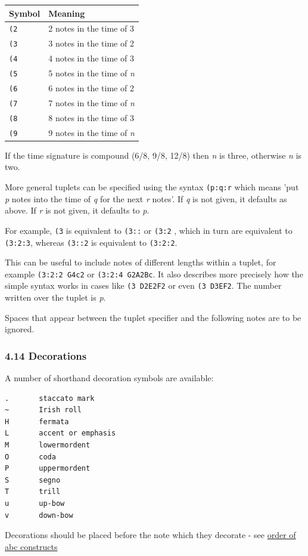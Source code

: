 \documentclass[oneside]{book}
\begin{document}
\begin{longtable}[]{@{}ll@{}}
\toprule
\textbf{Symbol} & \textbf{Meaning}\tabularnewline
\midrule
\endhead
\texttt{(2} & 2 notes in the time of 3\tabularnewline
\texttt{(3} & 3 notes in the time of 2\tabularnewline
\texttt{(4} & 4 notes in the time of 3\tabularnewline
\texttt{(5} & 5 notes in the time of \emph{n}\tabularnewline
\texttt{(6} & 6 notes in the time of 2\tabularnewline
\texttt{(7} & 7 notes in the time of \emph{n}\tabularnewline
\texttt{(8} & 8 notes in the time of 3\tabularnewline
\texttt{(9} & 9 notes in the time of \emph{n}\tabularnewline
\bottomrule
\end{longtable}

If the time signature is compound (6/8, 9/8, 12/8) then \emph{n} is
three, otherwise \emph{n} is two.

More general tuplets can be specified using the syntax \texttt{(p:q:r}
which means 'put \emph{p} notes into the time of \emph{q} for the next
\emph{r} notes'. If \emph{q} is not given, it defaults as above. If
\emph{r} is not given, it defaults to \emph{p}.

For example, \texttt{(3} is equivalent to \texttt{(3::} or \texttt{(3:2}
, which in turn are equivalent to \texttt{(3:2:3}, whereas
\texttt{(3::2} is equivalent to \texttt{(3:2:2}.

This can be useful to include notes of different lengths within a
tuplet, for example \texttt{(3:2:2\ G4c2} or \texttt{(3:2:4\ G2A2Bc}. It
also describes more precisely how the simple syntax works in cases like
\texttt{(3\ D2E2F2} or even \texttt{(3\ D3EF2}. The number written over
the tuplet is \emph{p}.

Spaces that appear between the tuplet specifier and the following notes
are to be ignored.

\hypertarget{decorations}{\subsubsection{4.14
Decorations}\label{decorations}}

A number of shorthand decoration symbols are available:

\begin{verbatim}
.       staccato mark
~       Irish roll
H       fermata
L       accent or emphasis
M       lowermordent
O       coda
P       uppermordent
S       segno
T       trill
u       up-bow
v       down-bow
\end{verbatim}

Decorations should be placed before the note which they decorate - see
\protect\hyperlink{order_of_abc_constructs}{order of abc constructs}
\end{document}
